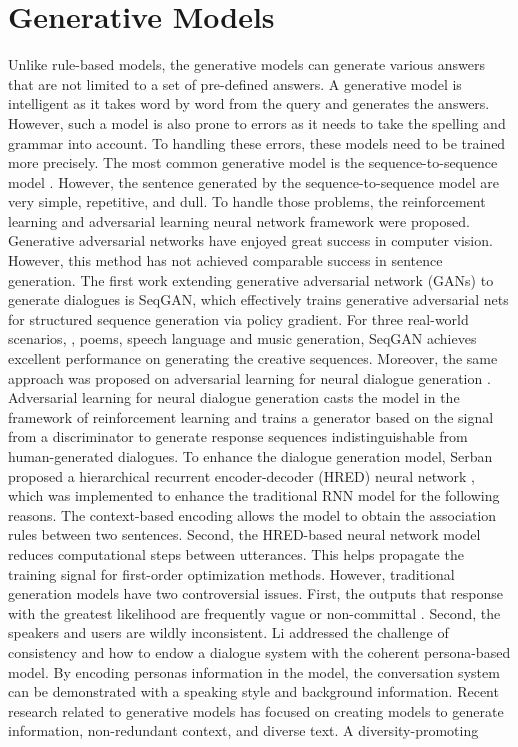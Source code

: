 \section{Generative Models}\label{subsubsec:Generative Models}
Unlike rule-based models, the generative models \cite{Deep_Reinforcement_Learning_for_Dialogue_Generation} can generate various answers that are not limited to a set of pre-defined answers. A generative model is intelligent as it takes word by word from the query and generates the answers. However, such a model is also prone to errors as it needs to take the spelling and grammar into account. To handling these errors, these models need to be trained more precisely. The most common generative model is the sequence-to-sequence model \cite{Sequence_to_sequence_learning_with_neural_networks}. However, the sentence generated by the sequence-to-sequence model are very simple, repetitive, and dull. To handle those problems, the reinforcement learning and adversarial learning neural network framework were proposed. Generative adversarial networks have enjoyed great success in computer vision. However, this method has not achieved comparable success in sentence generation. The first work \cite{SeqGAN} extending generative adversarial network (GANs) to generate dialogues is SeqGAN, which effectively trains generative adversarial nets for structured sequence generation via policy gradient. For three real-world scenarios, \ie, poems, speech language and music generation, SeqGAN achieves excellent performance on generating the creative sequences. Moreover, the same approach was proposed on adversarial learning for neural dialogue generation \cite{Adversarial_Learning_for_Neural_Dialogue_Generation}. Adversarial learning for neural dialogue generation casts the model in the framework of reinforcement learning and trains a generator based on the signal from a discriminator to generate response sequences indistinguishable from human-generated dialogues. To enhance the dialogue generation model, Serban \etal proposed a hierarchical recurrent encoder-decoder (HRED) neural network \cite{Hierarchical_Neural_Network_Generative_Models_for_Movie_Dialogues}, which was implemented to enhance the traditional RNN model for the following reasons. The context-based encoding allows the model to obtain the association rules between two sentences. Second, the HRED-based neural network model reduces computational steps between utterances. This helps propagate the training signal for first-order optimization methods. However, traditional generation models have two controversial issues. First, the outputs that response with the greatest likelihood are frequently vague or non-committal \cite{A_Diversity-Promoting_Objective_Function_for_Neural_Conversation_Models}. Second, the speakers and users are wildly inconsistent. Li \etal addressed the challenge of consistency and how to endow a dialogue system with the coherent persona-based model. By encoding personas information in the model, the conversation system can be demonstrated with a speaking style and background information. Recent research related to generative models has focused on creating models to generate information, non-redundant context, and diverse text. A diversity-promoting 